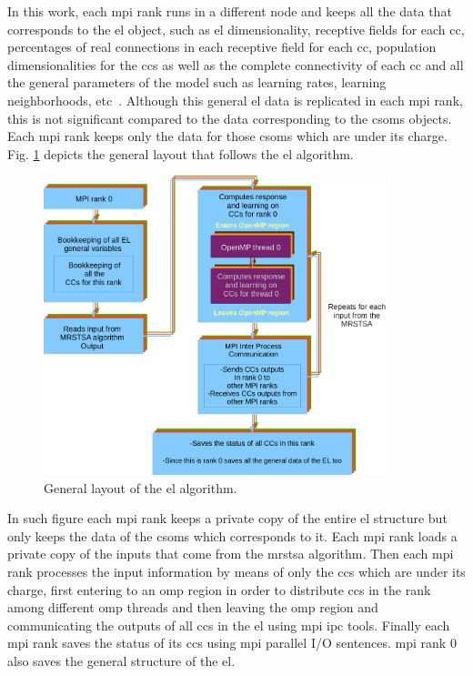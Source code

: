 {In this work, each \gls{mpi} rank runs in a different node and keeps all the data that corresponds to the \gls{el} object, such as \gls{el} dimensionality, receptive fields for each \gls{cc}, percentages of real connections in each receptive field for each \gls{cc}, population dimensionalities for the \glspl{cc} as well as the complete connectivity of each \gls{cc} and all the general parameters of the model such as learning rates, learning neighborhoods, etc~\cite{10.1371/journal.pone.0217966}. Although this general \gls{el} data is replicated in each \gls{mpi} rank, this is not significant compared to the data corresponding to the \glspl{csom} objects. Each \gls{mpi} rank keeps only the data for those \glspl{csom} which are under its charge. Fig. \ref{fig:EL_ALG} depicts the general layout that follows the \gls{el} algorithm.

\begin{figure}[ht]
    \centering
    \includegraphics[width=0.9\textwidth]{EL_ALG.png}
    \caption{General layout of the \gls{el} algorithm.} 
    \label{fig:EL_ALG}
\end{figure}

In such figure each \gls{mpi} rank keeps a private copy of the entire \gls{el} structure but only keeps the data of the \glspl{csom} which corresponds to it. Each \gls{mpi} rank loads a private copy of the inputs that come from the \gls{mrstsa} algorithm. Then each \gls{mpi} rank processes the input information by means of only the \glspl{cc} which are under its charge, first entering to an \gls{omp} region in order to distribute \glspl{cc} in the rank among different \gls{omp} threads and then leaving the \gls{omp} region and communicating the outputs of all \glspl{cc} in the \gls{el} using \gls{mpi} \gls{ipc} tools. Finally each \gls{mpi} rank saves the status of its \glspl{cc} using \gls{mpi} parallel I/O sentences. \gls{mpi} rank 0 also saves the general structure of the \gls{el}.
}

















